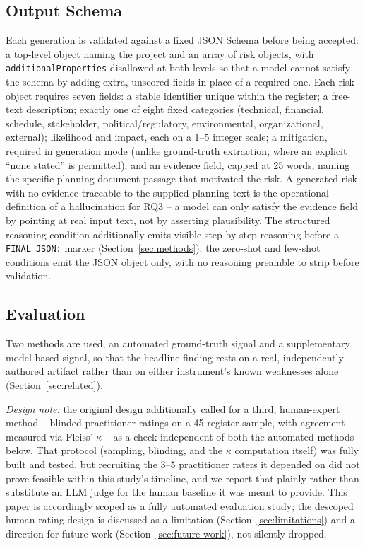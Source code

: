 \documentclass[conference]{IEEEtran}
\begin{document}
\subsection{Output Schema}
Each generation is validated against a fixed JSON Schema before being
accepted: a top-level object naming the project and an array of risk
objects, with \texttt{additionalProperties} disallowed at both levels so
that a model cannot satisfy the schema by adding extra, unscored fields in
place of a required one. Each risk object requires seven fields: a stable
identifier unique within the register; a free-text description; exactly one
of eight fixed categories (technical, financial, schedule, stakeholder,
political/regulatory, environmental, organizational, external); likelihood
and impact, each on a 1--5 integer scale; a mitigation, required in
generation mode (unlike ground-truth extraction, where an explicit
``none stated'' is permitted); and an evidence field, capped at 25 words,
naming the specific planning-document passage that motivated the risk. A
generated risk with no evidence traceable to the supplied planning text is
the operational definition of a hallucination for RQ3 -- a model can only
satisfy the evidence field by pointing at real input text, not by asserting
plausibility. The structured reasoning condition additionally emits visible
step-by-step reasoning before a \texttt{FINAL JSON:} marker
(Section~\ref{sec:methods}); the zero-shot and few-shot conditions emit the
JSON object only, with no reasoning preamble to strip before validation.

\subsection{Evaluation}
Two methods are used, an automated ground-truth signal and a supplementary
model-based signal, so that the headline finding rests on a real,
independently authored artifact rather than on either instrument's known
weaknesses alone (Section~\ref{sec:related}).

\textit{Design note:} the original design additionally called for a third,
human-expert method -- blinded practitioner ratings on a 45-register
sample, with agreement measured via Fleiss' $\kappa$ -- as a check
independent of both the automated methods below. That protocol (sampling,
blinding, and the $\kappa$ computation itself) was fully built and tested,
but recruiting the 3--5 practitioner raters it depended on did not prove
feasible within this study's timeline, and we report that plainly rather
than substitute an LLM judge for the human baseline it was meant to
provide. This paper is accordingly scoped as a fully automated evaluation
study; the descoped human-rating design is discussed as a limitation
(Section~\ref{sec:limitations}) and a direction for future work
(Section~\ref{sec:future-work}), not silently dropped.
\end{document}
